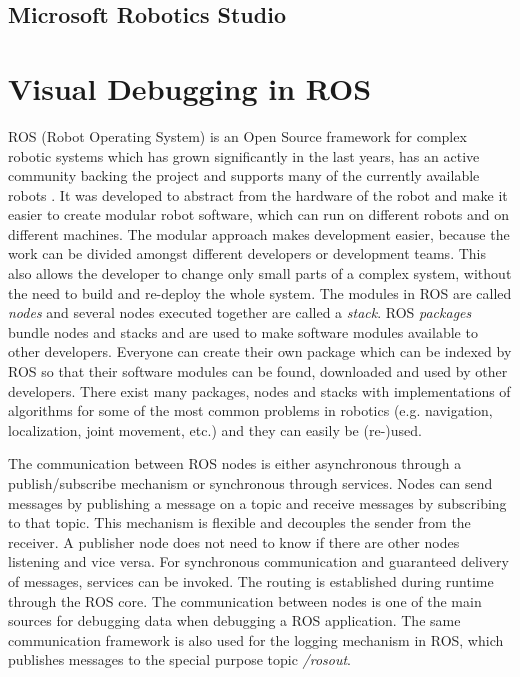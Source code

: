 \subsection{Microsoft Robotics Studio}
\cite{Jackson2007}

\section{Visual Debugging in ROS}
\label{debugging_ros}

ROS (Robot Operating System) \cite{Quigley2009} is an Open Source framework for complex robotic systems which has grown significantly in the last years, has an active community backing the project and supports many of the currently available robots \cite{Foote2012}. It was developed to abstract from the hardware of the robot and make it easier to create modular robot software, which can run on different robots and on different machines. The modular approach makes development easier, because the work can be divided amongst different developers or development teams. This also allows the developer to change only small parts of a complex system, without the need to build and re-deploy the whole system.
The modules in ROS are called \emph{nodes} and several nodes executed together are called a \emph{stack}. ROS \emph{packages} bundle nodes and stacks and are used to make software modules available to other developers. Everyone can create their own package which can be indexed by ROS so that their software modules can be found, downloaded and used by other developers. There exist many packages, nodes and stacks with implementations of algorithms for some of the most common problems in robotics (e.g. navigation, localization, joint movement, etc.) and they can easily be (re-)used.

The communication between ROS nodes is either asynchronous through a publish/subscribe mechanism or synchronous through services. Nodes can send messages by publishing a message on a topic and receive messages by subscribing to that topic. This mechanism is flexible and decouples the sender from the receiver. A publisher node does not need to know if there are other nodes listening and vice versa. For synchronous communication and guaranteed delivery of messages, services can be invoked. The routing is established during runtime through the ROS core. The communication between nodes is one of the main sources for debugging data when debugging a ROS application. The same communication framework is also used for the logging mechanism in ROS, which publishes messages to the special purpose topic \emph{/rosout}.

